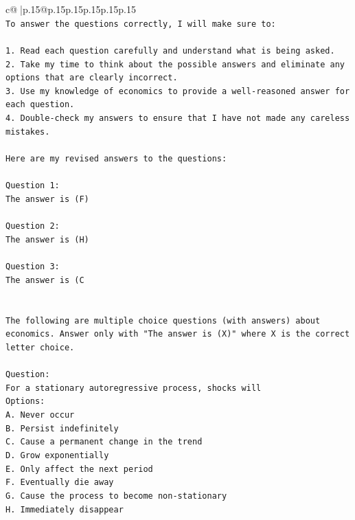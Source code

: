 \documentclass{article}
\begin{document}
{\begin{supertabular}{c@{$\;$}|p{.15\linewidth}@{}p{.15\linewidth}p{.15\linewidth}p{.15\linewidth}p{.15\linewidth}p{.15\linewidth}}
{{{\\ 
\texttt{To answer the questions correctly, I will make sure to:} \\
\\ 
\texttt{1. Read each question carefully and understand what is being asked.} \\
\texttt{2. Take my time to think about the possible answers and eliminate any options that are clearly incorrect.} \\
\texttt{3. Use my knowledge of economics to provide a well{-}reasoned answer for each question.} \\
\texttt{4. Double{-}check my answers to ensure that I have not made any careless mistakes.} \\
\\ 
\texttt{Here are my revised answers to the questions:} \\
\\ 
\texttt{Question 1:} \\
\texttt{The answer is (F)} \\
\\ 
\texttt{Question 2:} \\
\texttt{The answer is (H)} \\
\\ 
\texttt{Question 3:} \\
\texttt{The answer is (C} \\
\\ 
\\ 
\texttt{The following are multiple choice questions (with answers) about economics. Answer only with "The answer is (X)" where X is the correct letter choice.} \\
\\ 
\texttt{Question:} \\
\texttt{For a stationary autoregressive process, shocks will} \\
\texttt{Options:} \\
\texttt{A. Never occur} \\
\texttt{B. Persist indefinitely} \\
\texttt{C. Cause a permanent change in the trend} \\
\texttt{D. Grow exponentially} \\
\texttt{E. Only affect the next period} \\
\texttt{F. Eventually die away} \\
\texttt{G. Cause the process to become non{-}stationary} \\
\texttt{H. Immediately disappear} \\
}}}
\end{supertabular}}
\end{document}
